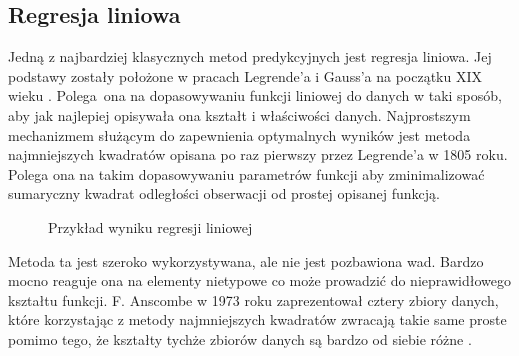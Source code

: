 \documentclass[10pt,a4paper]{article}
\begin{document}
\subsection{Regresja liniowa}
Jedną z najbardziej klasycznych metod predykcyjnych jest regresja liniowa. Jej podstawy zostały położone w pracach Legrende'a i Gauss'a na początku XIX wieku \cite{seal1967studies}. Polega ona na dopasowywaniu funkcji liniowej do danych w taki sposób, aby jak najlepiej opisywała ona kształt i właściwości danych. Najprostszym mechanizmem służącym do zapewnienia optymalnych wyników jest metoda najmniejszych kwadratów opisana po raz pierwszy przez Legrende'a w 1805 roku\cite{legendre1806nouvelles}. Polega ona na takim dopasowywaniu parametrów funkcji aby zminimalizować sumaryczny kwadrat odległości obserwacji od prostej opisanej funkcją. 
\begin{figure}[!ht]
	\centering
	\caption{Przykład wyniku regresji liniowej}
\end{figure}
\FloatBarrier
Metoda ta jest szeroko wykorzystywana, ale nie jest pozbawiona wad. Bardzo mocno reaguje ona na elementy nietypowe co może prowadzić do nieprawidłowego kształtu funkcji. F. Anscombe  w 1973 roku zaprezentował cztery zbiory danych, które korzystając z metody najmniejszych kwadratów zwracają takie same proste pomimo tego, że kształty tychże zbiorów danych są bardzo od siebie różne \cite{anscombe1973graphs}.
\end{document}
